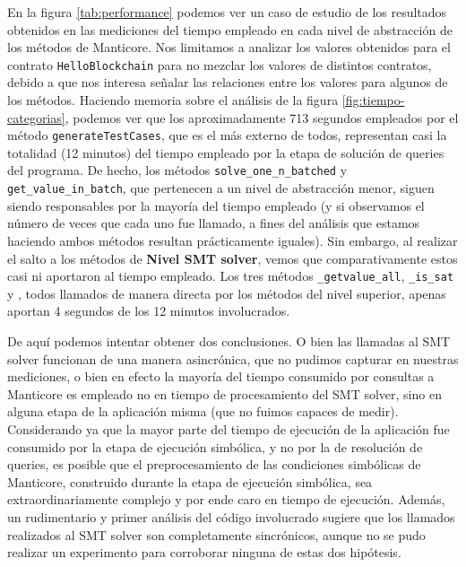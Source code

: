 En la figura \ref{tab:performance} podemos ver un caso de estudio de los resultados obtenidos en las mediciones del tiempo empleado en cada nivel de abstracción de los métodos de Manticore.
Nos limitamos a analizar los valores obtenidos para el contrato \texttt{HelloBlockchain} para no mezclar los valores de distintos contratos, debido a que nos interesa señalar las relaciones entre los valores para algunos de los métodos.
Haciendo memoria sobre el análisis de la figura \ref{fig:tiempo-categorias}, podemos ver que los aproximadamente 713 segundos empleados por el método \texttt{generateTestCases}, que es el más externo de todos, representan casi la totalidad (12 minutos) del tiempo empleado por la etapa de solución de queries del programa.
De hecho, los métodos \texttt{solve\_one\_n\_batched} y \texttt{get\_value\_in\_batch}, que pertenecen a un nivel de abstracción menor, siguen siendo responsables por la mayoría del tiempo empleado (y si observamos el número de veces que cada uno fue llamado, a fines del análisis que estamos haciendo ambos métodos resultan prácticamente iguales).
Sin embargo, al realizar el salto a los métodos de \textbf{Nivel SMT solver}, vemos que comparativamente estos casi ni aportaron al tiempo empleado.
Los tres métodos \texttt{\_getvalue\_all}, \texttt{\_is\_sat} y , todos llamados de manera directa por los métodos del nivel superior, apenas aportan 4 segundos de los 12 minutos involucrados.

De aquí podemos intentar obtener dos conclusiones.
O bien las llamadas al SMT solver funcionan de una manera asincrónica, que no pudimos capturar en nuestras mediciones, o bien en efecto la mayoría del tiempo consumido por consultas a Manticore es empleado no en tiempo de procesamiento del SMT solver, sino en alguna etapa de la aplicación misma (que no fuimos capaces de medir).
Considerando ya que la mayor parte del tiempo de ejecución de la aplicación fue consumido por la etapa de ejecución simbólica, y no por la de resolución de queries, es posible que el preprocesamiento de las condiciones simbólicas de Manticore, construido durante la etapa de ejecución simbólica, sea extraordinariamente complejo y por ende caro en tiempo de ejecución.
Además, un rudimentario y primer análisis del código involucrado sugiere que los llamados realizados al SMT solver son completamente sincrónicos, aunque no se pudo realizar un experimento para corroborar ninguna de estas dos hipótesis.



